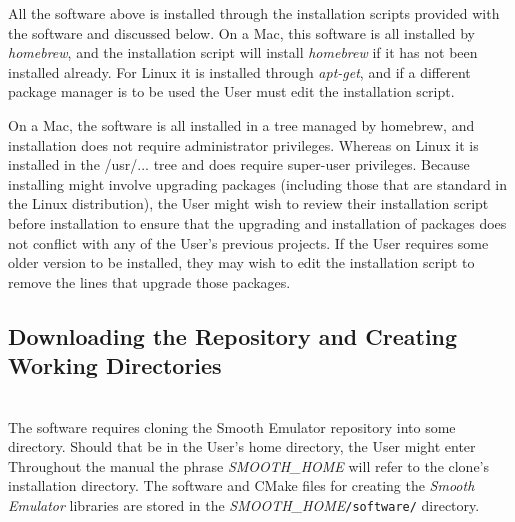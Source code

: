 \documentclass[UserManual.tex]{subfiles}
\begin{document}
\begin{sloppypar}
All the software above is installed through the installation scripts provided with the software and discussed below. On a Mac, this software is all installed by {\it homebrew}, and the installation script will install {\it homebrew} if it has not been installed already. For Linux it is installed through {\it apt-get}, and if a different package manager is to be used the User must edit the installation script. 

On a Mac, the software is all installed in a tree managed by homebrew, and installation does not require administrator privileges. Whereas on Linux it is installed in the {/usr/...} tree and does require super-user privileges. Because installing might involve upgrading packages (including those that are standard in the Linux distribution), the User might wish to review their installation script before installation to ensure that the upgrading and installation of packages does not conflict with any of the User's previous projects. If the User requires some older version to be installed, they may wish to edit the installation script to remove the lines that upgrade those packages.

\subsection{Downloading the Repository and Creating Working Directories}\label{subsec:download}

\\
The software requires cloning the Smooth Emulator repository into some directory. Should that be in the User's home directory, the User might enter
\vspace*{-8pt}{\tt \begin{Verbatim}[commandchars=\\\{\}]
/Users/CarlosSmith% \textcolor{darkred}{git clone https://github.com/bandframework/SmoothEmulator.git}
\end{Verbatim}
}\vspace*{-8pt}
Throughout the manual the phrase \textit{SMOOTH\_HOME} will refer to the clone's installation directory. The software and CMake files for creating the {\it Smooth Emulator} libraries are stored in the \textit{SMOOTH\_HOME}{\tt /software/} directory.


\end{sloppypar}
\end{document}
